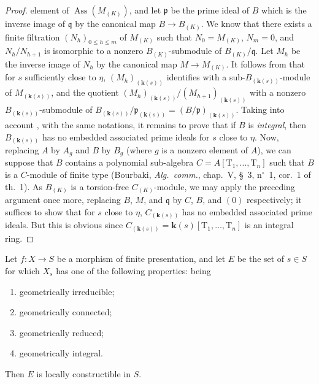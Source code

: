 \begin{proof}
element of $\operatorname{Ass}(M_{(K)})$, and let $\mathfrak{p}$ be the prime ideal of $B$ which is the inverse image of $\mathfrak{q}$ by the canonical map $B\to B_{(K)}$.
We know  that there exists a finite filtration $(N_h)_{0\leqslant h\leqslant m}$ of $M_{(K)}$ such that $N_0=M_{(K)}$, $N_m=0$, and $N_h/N_{h+1}$ is isomorphic to a nonzero $B_{(K)}$-submodule of $B_{(K)}/\mathfrak{q}$.
Let $M_h$ be the inverse image of $N_h$ by the canonical map $M\to M_{(K)}$.
It follows from  that for $s$ sufficiently close to $\eta$, $(M_h)_{(\boldsymbol{k}(s))}$ identifies with a sub-$B_{(\boldsymbol{k}(s))}$-module of $M_{(\boldsymbol{k}(s))}$, and the quotient $(M_h)_{(\boldsymbol{k}(s))}/(M_{h+1})_{(\boldsymbol{k}(s))}$ with a nonzero $B_{(\boldsymbol{k}(s))}$-submodule of $B_{(\boldsymbol{k}(s))}/\mathfrak{p}_{(\boldsymbol{k}(s))}=(B/\mathfrak{p})_{(\boldsymbol{k}(s))}$.
Taking into account , with the same notations, it remains to prove that if $B$ is \emph{integral}, then $B_{(\boldsymbol{k}(s))}$ has no embedded associated prime ideals for $s$ close to $\eta$.
Now, replacing $A$ by $A_g$ and $B$ by $B_g$ (where $g$ is a nonzero element of $A$), we can suppose that $B$ contains a polynomial sub-algebra $C=A[\mathrm{T}_1,\ldots,\mathrm{T}_n]$ such that $B$ is a $C$-module of finite type (Bourbaki, \emph{Alg.\ comm.}, chap.\ V, \S~3, n$^\circ$~1, cor.\ 1 of th.\ 1).
As $B_{(K)}$ is a torsion-free $C_{(K)}$-module, we may apply the preceding argument once more, replacing $B$, $M$, and $\mathfrak{q}$ by $C$, $B$, and $(0)$ respectively; it suffices to show that for $s$ close to $\eta$, $C_{(\boldsymbol{k}(s))}$ has no embedded associated prime ideals.
But this is obvious since $C_{(\boldsymbol{k}(s))}=\boldsymbol{k}(s)[\mathrm{T}_1,\ldots,\mathrm{T}_n]$ is an integral ring.
\end{proof}

\begin{theorem}[9.7.7]
\label{IV.9.7.7}
Let $f:X\to S$ be a morphism of finite presentation, and let $E$ be the set of $s\in S$ for which $X_s$ has one of the following properties: being
\begin{enumerate}[label=(\roman*)]
  \item geometrically irreducible;
  \item geometrically connected;
  \item geometrically reduced;
  \item geometrically integral.
\end{enumerate}
Then $E$ is locally constructible in $S$.
\end{theorem}

